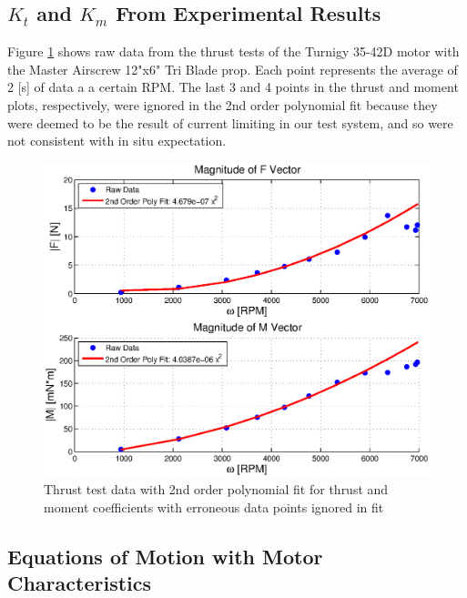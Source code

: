 \documentclass{article}
\numberwithin{equation}{section}
\begin{document}
\subsection{$K_t$ and $K_m$ From Experimental Results}
Figure \ref{thrustAndMomCoeffs} shows raw data from the thrust tests of the Turnigy 35-42D motor with the Master Airscrew 12"x6" Tri Blade prop.  Each point represents the average of 2 [s] of data a a certain RPM.  The last 3 and 4 points in the thrust and moment plots, respectively, were ignored in the 2nd order polynomial fit because they were deemed to be the result of current limiting in our test system, and so were not consistent with in situ expectation. 
\begin{figure}[h]
  \includegraphics[width=5in]{images/forceAndMomMagFitOmega.eps}
  \caption{Thrust test data with 2nd order polynomial fit for thrust and moment coefficients with erroneous data points ignored in fit}
   \label{thrustAndMomCoeffs}
\end{figure}

\subsection{Equations of Motion with Motor Characteristics}
\end{document}
